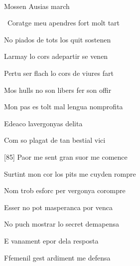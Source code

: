 \documentclass[12pt]{article}
\renewcommand{\espaiAbansEtiquetaPoema}{\vspace{0ex}}
\begin{document}
\begin{estrofa}

\espaiAbansEtiquetaPoema

\\

\begin{rubrica}

\textsection{} Mossen Ausias march \textsection{}

\end{rubrica}

\end{estrofa}


\begin{estrofa}

 \textparagraph\  Coratge meu apendres fort molt tart

 No piados de tots los quit sostenen

 Larmay lo cors adepartir se venen

 Pertu ser flach lo cors de viures fart

 Mos hulls no son libers fer son offir

 Mon pas es tolt mal lengua nomprofita

 Edeaco lavergonyas delita

 Com so plagat de tan bestial vici

\end{estrofa}



\begin{estrofa}

 [85] Paor me sent gran suor me comence

 Surtint mon cor los pits me cuyden rompre

 Nom trob esforc per vergonya corompre

 Esser no pot masperanca por venca

 No puch mostrar lo secret demapensa

 E vanament epor dela resposta

 

 Ffemenil gest ardiment me defensa

\end{estrofa}
\end{document}
